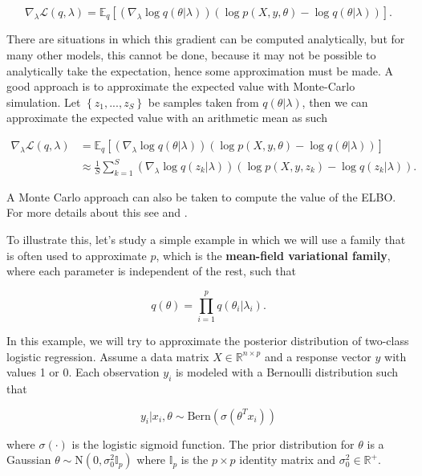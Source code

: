 \begin{equation}
  \label{eq:ELBO_gradient}
  \nabla_{\lambda} \mathcal{L}(q, \lambda) =
  \mathbb{E}_q \left[ \left( \nabla_{\lambda} \log q(\theta | \lambda) \right) \left( \log p(X, y, \theta) - \log q(\theta | \lambda) \right) \right].
\end{equation}

There are situations in which this gradient can be computed analytically, but for many other models, this cannot be done, because it may not be possible to analytically take the expectation, hence some approximation must be made. A good approach is to approximate the expected value with Monte-Carlo simulation. Let $\left\{ z_1, ..., z_S \right\}$ be samples taken from $q(\theta | \lambda)$, then we can approximate the expected value with an arithmetic mean as such

\begin{equation*}
  \begin{split}
  \nabla_{\lambda} \mathcal{L}(q, \lambda) &=
  \mathbb{E}_q \left[ \left( \nabla_{\lambda} \log q(\theta | \lambda) \right) \left( \log p(X, y, \theta) - \log q(\theta | \lambda) \right) \right] \\
  & \approx \frac{1}{S} \sum_{k = 1}^S \left( \nabla_{\lambda} \log q(z_k | \lambda) \right) \left( \log p(X, y, z_k) - \log q(z_k | \lambda) \right).
  \end{split}
\end{equation*}


A Monte Carlo approach can also be taken to compute the value of the ELBO. For more details about this see \cite{kucukelbir2017automatic} and \cite{ranganath2014black}.

To illustrate this, let's study a simple example in which we will use a family that is often used to approximate $p$, which is the \textbf{mean-field variational family}, where each parameter is independent of the rest, such that

$$
  q(\theta) = \prod_{i = 1}^p q(\theta_i | \lambda_i).
$$

In this example, we will try to approximate the posterior distribution of two-class logistic regression. Assume a data matrix $X \in \mathbb{R}^{n \times p}$ and a response vector $y$ with values 1 or 0. Each observation $y_i$ is modeled with a Bernoulli distribution such that

$$
  y_i | x_i, \theta \sim \mathrm{Bern}(\sigma(\theta^T x_i))
$$

where $\sigma(\cdot)$ is the logistic sigmoid function. The prior distribution for $\theta$ is a Gaussian $\theta \sim \mathrm{N}(0, \sigma_0^2 \mathbb{I}_p)$ where $\mathbb{I}_p$ is the $p \times p$ identity matrix and $\sigma_0^2 \in \mathbb{R}^+$.

